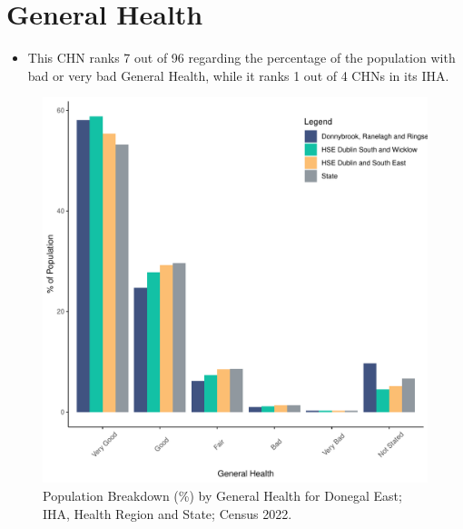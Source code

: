 \documentclass{article}
\begin{document}
\pagebreak

\section{General Health}\label{sect:GenHealth}
\begin{itemize}
\item  This CHN ranks  7 out of 96 regarding the percentage of the population with bad or very bad General Health, while it ranks   1 out of 4 CHNs in its IHA.
\end{itemize}
\begin{figure}[h]
	\centering
	\includegraphics[width = 150mm]{../figures/GenED.pdf}
	\caption{Population Breakdown (\%) by General Health for Donegal East; IHA, Health Region and State;  Census 2022.}
	\label{fig:2ae19629-1a6a-13a3-e055-000000000001}
	\end{figure}
\end{document}

